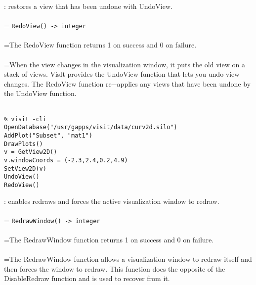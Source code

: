 \documentclass[10pt,a4paper]{report}
\begin{document}
{}
: restores a view that has been undone with UndoView.\\[-3mm]

 \\ 
\hangindent=\parindent 
\verb!RedoView() -> integer!\\ [-3mm]

 \\ 
\hangindent=\parindent The RedoView function returns 1 on success and 0 on failure. \\[-3mm] 

 \\ 
\hangindent=\parindent When the view changes in the visualization window, it puts the old view on a stack of views. VisIt provides the UndoView function that lets you undo view changes. The RedoView function re$-$applies any views that have been undone by the UndoView function. \\[-3mm] 

\\[-6mm]
\begin{verbatim}% visit -cli
OpenDatabase("/usr/gapps/visit/data/curv2d.silo")
AddPlot("Subset", "mat1")
DrawPlots()
v = GetView2D()
v.windowCoords = (-2.3,2.4,0.2,4.9)
SetView2D(v)
UndoView()
RedoView()
\end{verbatim}
\newpage


{}
: enables redraws and forces the active visualization window to redraw.\\[-3mm]

 \\ 
\hangindent=\parindent 
\verb!RedrawWindow() -> integer!\\ [-3mm]

 \\ 
\hangindent=\parindent The RedrawWindow function returns 1 on success and 0 on failure. \\[-3mm] 

 \\ 
\hangindent=\parindent The RedrawWindow function allows a visualization window to redraw itself and then forces the window to redraw. This function does the opposite of the DisableRedraw function and is used to recover from it. \\[-3mm] 
\end{document}
